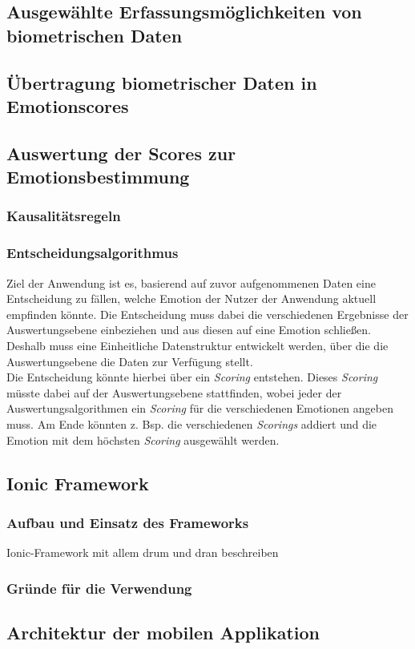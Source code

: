 \subsection{Ausgewählte Erfassungsmöglichkeiten von biometrischen Daten}
\subsection{Übertragung biometrischer Daten in Emotionscores}
\subsection{Auswertung der Scores zur Emotionsbestimmung}
\subsubsection{Kausalitätsregeln}
\subsubsection{Entscheidungsalgorithmus}
Ziel der Anwendung ist es, basierend auf zuvor aufgenommenen Daten eine Entscheidung zu fällen, welche Emotion der Nutzer der 
Anwendung aktuell empfinden könnte. Die Entscheidung muss dabei die verschiedenen Ergebnisse der Auswertungsebene einbeziehen
und aus diesen auf eine Emotion schließen. Deshalb muss eine Einheitliche Datenstruktur entwickelt werden, über die die Auswertungsebene
die Daten zur Verfügung stellt. \\
Die Entscheidung könnte hierbei über ein \textit{Scoring} entstehen. Dieses \textit{Scoring} müsste dabei auf der Auswertungsebene stattfinden, 
wobei jeder der Auswertungsalgorithmen ein \textit{Scoring} für die verschiedenen Emotionen angeben muss. Am Ende könnten z. Bsp. die verschiedenen 
\textit{Scorings} addiert und die Emotion mit dem höchsten \textit{Scoring} ausgewählt werden.
\subsection{Ionic Framework}
\subsubsection{Aufbau und Einsatz des Frameworks}
Ionic-Framework mit allem drum und dran beschreiben
\subsubsection{Gründe für die Verwendung}
\subsection{Architektur der mobilen Applikation}
